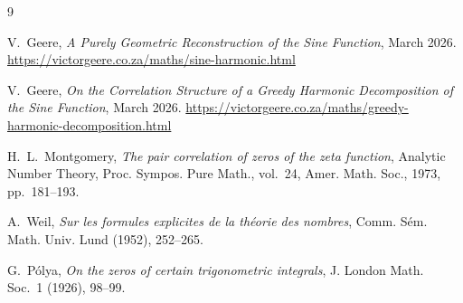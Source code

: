 \documentclass[11pt,a4paper]{article}
\theoremstyle{remark}
\begin{document}
\begin{thebibliography}{9}

V.~Geere, \emph{A Purely Geometric Reconstruction of the Sine Function},
March 2026. \url{https://victorgeere.co.za/maths/sine-harmonic.html}

V.~Geere, \emph{On the Correlation Structure of a Greedy Harmonic Decomposition of the Sine Function},
March 2026. \url{https://victorgeere.co.za/maths/greedy-harmonic-decomposition.html}

H.~L.~Montgomery, \emph{The pair correlation of zeros of the zeta function}, Analytic Number Theory, Proc. Sympos. Pure Math., vol.~24, Amer. Math. Soc., 1973, pp.~181--193.

A.~Weil, \emph{Sur les formules explicites de la th\'eorie des nombres}, Comm. S\'em. Math. Univ. Lund (1952), 252--265.

G.~P\'olya, \emph{On the zeros of certain trigonometric integrals}, J. London Math. Soc.~1 (1926), 98--99.

\end{thebibliography}
\end{document}
